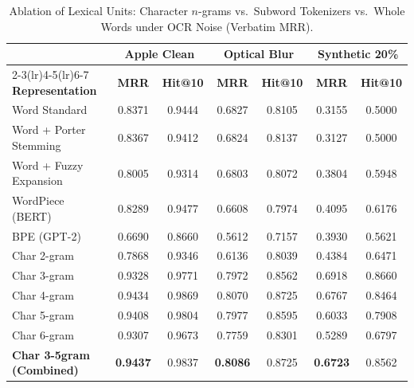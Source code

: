 \begin{table}[htbp]
\centering
\caption{Ablation of Lexical Units: Character $n$-grams vs.\ Subword Tokenizers vs.\ Whole Words under OCR Noise (Verbatim MRR).}
\label{tab:subword_ablation}
\begin{tabular}{lcccccc}
\toprule
& \multicolumn{2}{c}{\textbf{Apple Clean}} & \multicolumn{2}{c}{\textbf{Optical Blur}} & \multicolumn{2}{c}{\textbf{Synthetic 20\%}} \\
\cmidrule(lr){2-3}\cmidrule(lr){4-5}\cmidrule(lr){6-7}
\textbf{Representation} & \textbf{MRR} & \textbf{Hit@10} & \textbf{MRR} & \textbf{Hit@10} & \textbf{MRR} & \textbf{Hit@10} \\
\midrule
Word Standard & 0.8371 & 0.9444 & 0.6827 & 0.8105 & 0.3155 & 0.5000 \\
Word + Porter Stemming & 0.8367 & 0.9412 & 0.6824 & 0.8137 & 0.3127 & 0.5000 \\
Word + Fuzzy Expansion & 0.8005 & 0.9314 & 0.6803 & 0.8072 & 0.3804 & 0.5948 \\
WordPiece (BERT) & 0.8289 & 0.9477 & 0.6608 & 0.7974 & 0.4095 & 0.6176 \\
BPE (GPT-2) & 0.6690 & 0.8660 & 0.5612 & 0.7157 & 0.3930 & 0.5621 \\
Char 2-gram & 0.7868 & 0.9346 & 0.6136 & 0.8039 & 0.4384 & 0.6471 \\
Char 3-gram & 0.9328 & 0.9771 & 0.7972 & 0.8562 & 0.6918 & 0.8660 \\
Char 4-gram & 0.9434 & 0.9869 & 0.8070 & 0.8725 & 0.6767 & 0.8464 \\
Char 5-gram & 0.9408 & 0.9804 & 0.7977 & 0.8595 & 0.6033 & 0.7908 \\
Char 6-gram & 0.9307 & 0.9673 & 0.7759 & 0.8301 & 0.5289 & 0.6797 \\
\textbf{Char 3-5gram (Combined)} & \textbf{0.9437} & 0.9837 & \textbf{0.8086} & 0.8725 & \textbf{0.6723} & 0.8562 \\
\bottomrule
\end{tabular}
\end{table}
